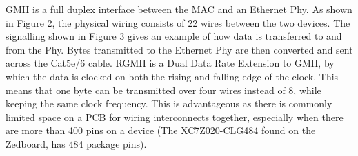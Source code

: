 \par GMII is a full duplex interface between the MAC and an Ethernet Phy. As shown in Figure 2, the physical wiring 
consists of 22 wires between the two devices. The signalling shown in Figure 3 gives an example of how data is 
transferred to and from the Phy. Bytes transmitted to the Ethernet Phy are then converted and sent across the 
Cat5e/6 cable. RGMII is a Dual Data Rate Extension to GMII, by which the data is clocked on both the rising and 
falling edge of the clock. This means that one byte can be transmitted over four wires instead of 8, while keeping 
the same clock frequency. This is advantageous as there is commonly limited space on a PCB for wiring interconnects 
together, especially when there are more than 400 pins on a device (The XC7Z020-CLG484 found on the Zedboard, has 
484 package pins). 

